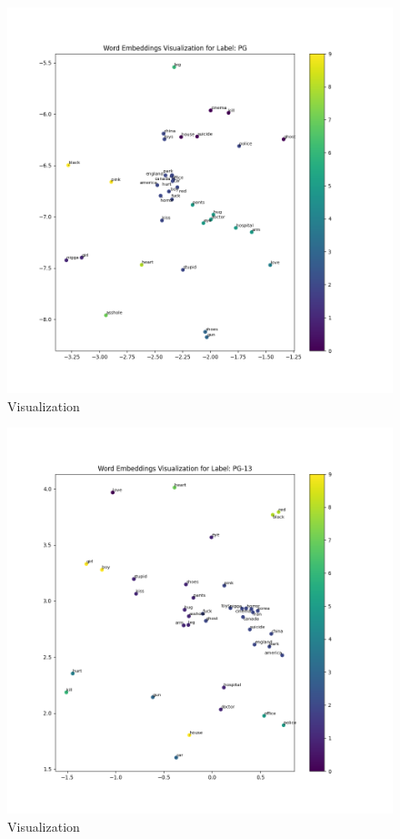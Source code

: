 \documentclass[a4paper]{article}
\begin{document}
\begin{figure}[ht]
    \centering
    \includegraphics[width=1\textwidth]{../stats/word_embeddings_PG.png}
    \caption{Visualization}
\end{figure}

\begin{figure}[ht]
    \centering
    \includegraphics[width=1\textwidth]{../stats/word_embeddings_PG-13.png}
    \caption{Visualization}
\end{figure}
\end{document}

